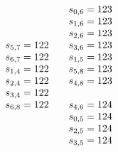 \documentclass[letterpaper]{article} %
\theoremstyle{definition}
\begin{document}
\[\begin{array}[t]{lllll}
\begin{array}{l}
s_{5, 7} = 122 \\
s_{6, 7} = 122 \\
s_{1, 4} = 122 \\
s_{2, 4} = 122 \\
s_{3, 4} = 122 \\
s_{6, 8} = 122 \\
   \end{array}
 &
  \begin{array}{l}
s_{0, 6} = 123 \\
s_{1, 6} = 123 \\
s_{2, 6} = 123 \\
s_{3, 6} = 123 \\
s_{1, 5} = 123 \\
s_{5, 8} = 123 \\
s_{4, 8} = 123 \\
\\
s_{4, 6} = 124 \\
s_{0, 5} = 124 \\
s_{2, 5} = 124 \\
s_{3, 5} = 124 \\
\end{array}
\end{array}
\]
\end{document}
